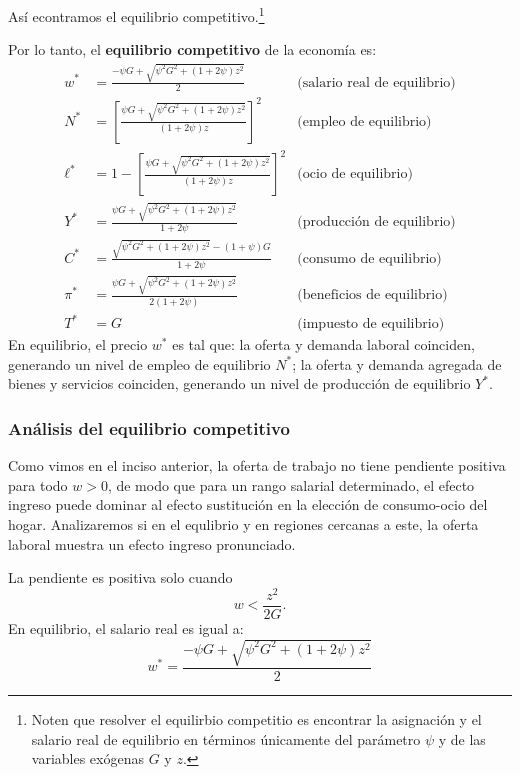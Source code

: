 \documentclass[11pt]{article}
\begin{document}
Así econtramos el equilibrio competitivo.\footnote{Noten que resolver el equilirbio competitio es encontrar la asignación y el salario real de equilibrio en términos únicamente del parámetro $\psi$ y de las variables exógenas $G$ y $z$.}

Por lo tanto, el \textbf{equilibrio competitivo} de la economía es:
\begin{equation}
  \boxed{
    \begin{aligned}
      w^* &= \frac{-\psi G+\sqrt{\psi^2G^2+(1+2\psi)z^2}}{2}
        & \text{(salario real de equilibrio)} \\[3mm]
      N^* &= \left[\frac{\psi G+\sqrt{\psi^2G^2+(1+2\psi)z^2}}{(1+2\psi)z}\right]^2
        & \text{(empleo de equilibrio)} \\[3mm]
      \ell^* &= 1-\left[\frac{\psi G+\sqrt{\psi^2G^2+(1+2\psi)z^2}}{(1+2\psi)z}\right]^2
        & \text{(ocio de equilibrio)} \\[3mm]
      Y^* &= \frac{\psi G+\sqrt{\psi^2G^2+(1+2\psi)z^2}}{1+2\psi}
        & \text{(producción de equilibrio)} \\[3mm]
      C^* &= \frac{\sqrt{\psi^2G^2+(1+2\psi)z^2}-(1+\psi)G}{1+2\psi}
        & \text{(consumo de equilibrio)} \\[3mm]
      \pi^* &= \frac{\psi G+\sqrt{\psi^2G^2+(1+2\psi)z^2}}{2(1+2\psi)}
        & \text{(beneficios de equilibrio)} \\[3mm]
      T^* &= G
        & \text{(impuesto de equilibrio)}
    \end{aligned}
  }
\end{equation}
En equilibrio, el precio $w^*$ es tal que: la oferta y demanda laboral coinciden, generando un nivel de empleo de equilibrio $N^*$; la oferta y demanda agregada de bienes y servicios coinciden, generando un nivel de producción de equilibrio $Y^*$.


\subsubsection*{Análisis del equilibrio competitivo}
Como vimos en el inciso anterior, la oferta de trabajo no tiene pendiente positiva para todo \(w>0\), de modo que para un rango salarial determinado, el efecto ingreso puede dominar al efecto sustitución en la elección de consumo-ocio del hogar. Analizaremos si en el equlibrio y en regiones cercanas a este, la oferta laboral muestra un efecto ingreso pronunciado.

La pendiente es positiva solo cuando
\[
w<\frac{z^2}{2G}.
\]
En equilibrio, el salario real es igual a:
$$
w^* = \frac{-\psi G+\sqrt{\psi^2G^2+(1+2\psi)z^2}}{2}
$$
\end{document}
